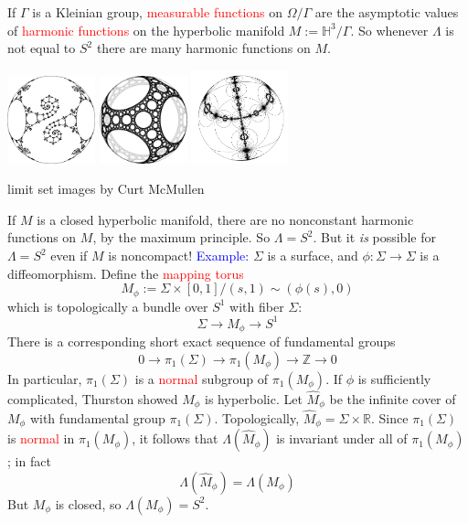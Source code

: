 \documentclass{beamer}
\def\Z{\mathbb{Z}}
\def\R{\mathbb{R}}
\def\H{\mathbb{H}}
\begin{document}
\frame
{
If $\Gamma$ is a Kleinian group, \textcolor{red}{measurable functions} on $\Omega/\Gamma$
are the asymptotic values of \textcolor{red}{harmonic functions} on the hyperbolic
manifold $M:=\H^3/\Gamma$.
\vskip 10pt
So whenever $\Lambda$ is not equal to $S^2$ there are many harmonic functions on $M$.
\begin{center}
\includegraphics[width=1in]{ctm_cusp.png}\hskip 13pt
\includegraphics[width=1in]{ctm_carpet.png}\hskip 8pt
\includegraphics[width=1.1in]{ctm_cylindrical.png}
\end{center}
\begin{center}
\small{limit set images by Curt McMullen}
\end{center}
}
\frame
{
If $M$ is a closed hyperbolic manifold, there are no nonconstant harmonic functions on $M$,
by the \textcolor{dgreen}{maximum principle}. So $\Lambda = S^2$.
\vskip 10pt
But it {\em is} possible for $\Lambda = S^2$ even if $M$ is noncompact!
}
\frame
{
\textcolor{blue}{Example:} $\Sigma$ is a surface, and $\phi:\Sigma \to \Sigma$ is
a diffeomorphism. Define the \textcolor{red}{mapping torus}
$$M_\phi:=\Sigma\times [0,1]/(s,1)\sim(\phi(s),0)$$
which is topologically a bundle over $S^1$ with fiber $\Sigma$:
$$\Sigma \to M_\phi \to S^1$$
}
\frame
{
There is a corresponding short exact sequence of fundamental groups
$$0 \to \pi_1(\Sigma) \to \pi_1(M_\phi) \to \Z \to 0$$
In particular, $\pi_1(\Sigma)$ is a \textcolor{red}{normal} subgroup of $\pi_1(M_\phi)$.
\vskip 10pt
If $\phi$ is sufficiently complicated, Thurston showed $M_\phi$ is hyperbolic.
}
\frame
{
Let $\widehat{M}_\phi$ be the infinite cover of $M_\phi$ with fundamental group
$\pi_1(\Sigma)$. Topologically, $\widehat{M}_\phi = \Sigma \times \R$.
\vskip 10pt
Since $\pi_1(\Sigma)$ is \textcolor{red}{normal} in $\pi_1(M_\phi)$, it follows that
$\Lambda(\widehat{M}_\phi)$ is invariant under all of $\pi_1(M_\phi)$; in fact
$$\Lambda(\widehat{M}_\phi) = \Lambda(M_\phi)$$
But $M_\phi$ is closed, so $\Lambda(M_\phi)=S^2$.
}
\end{document}
